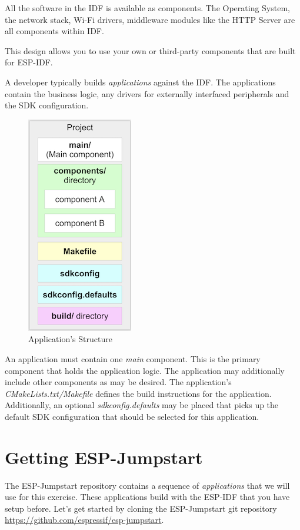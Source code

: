 \documentclass[main.tex]{subfiles}
\begin{document}
All the software in the IDF is available as components. The Operating System, the network stack, Wi-Fi drivers, middleware modules like the HTTP Server are all components within IDF. 

This design allows you to use your own or third-party components that are built for ESP-IDF.

A developer typically builds \textit{applications} against the IDF. The applications contain the business logic, any drivers for externally interfaced peripherals and the SDK configuration.

\begin{figure}[h!]
    \centering
    \includegraphics[scale=0.6]{../../_static/app_structure.png}
    \caption{Application's Structure}
    \label{fig:app_structure}
\end{figure}

An application must contain one \textit{main} component. This is the primary component that holds the application logic. The application may additionally include other components as may be desired.
The application's \textit{CMakeLists.txt/Makefile} defines the build instructions for the application.
Additionally, an optional \textit{sdkconfig.defaults} may be placed that picks up the default SDK configuration that should be selected for this application.


\section{Getting ESP-Jumpstart}

The ESP-Jumpstart repository contains a sequence of \textit{applications} that we will use for this exercise. These applications build with the ESP-IDF that you have setup before. Let's get started by cloning the ESP-Jumpstart git repository \url{https://github.com/espressif/esp-jumpstart}. 
\end{document}
